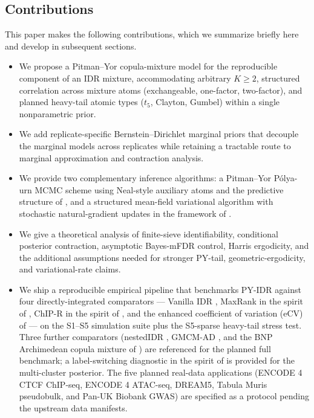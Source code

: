 \subsection{Contributions}

This paper makes the following contributions, which we summarize briefly here and develop in subsequent sections.
\begin{itemize}[leftmargin=*]
\item We propose a Pitman--Yor copula-mixture model for the reproducible component of an IDR mixture, accommodating arbitrary $K \geq 2$, structured correlation across mixture atoms (exchangeable, one-factor, two-factor), and planned heavy-tail atomic types ($t_5$, Clayton, Gumbel) within a single nonparametric prior.
\item We add replicate-specific Bernstein--Dirichlet marginal priors that decouple the marginal models across replicates while retaining a tractable route to marginal approximation and contraction analysis.
\item We provide two complementary inference algorithms: a Pitman--Yor P\'olya-urn MCMC scheme using Neal-style auxiliary atoms \citep{Neal2000} and the predictive structure of \citet{Pitman1996BlackwellMacQueen,IshwaranJames2001}, and a structured mean-field variational algorithm with stochastic natural-gradient updates in the framework of \citet{HoffmanBleiWangPaisley2013}.
\item We give a theoretical analysis of finite-sieve identifiability, conditional posterior contraction, asymptotic Bayes-mFDR control, Harris ergodicity, and the additional assumptions needed for stronger PY-tail, geometric-ergodicity, and variational-rate claims.
\item We ship a reproducible empirical pipeline that benchmarks PY-IDR against four directly-integrated comparators --- Vanilla IDR \citep{LiBrownHuangBickel2011}, MaxRank in the spirit of \citet{Philtron2018MaRR}, ChIP-R in the spirit of \citet{Newell2021ChIPR}, and the enhanced coefficient of variation (eCV) of \citet{Iakovidis2024eCV} --- on the S1--S5 simulation suite plus the S5-sparse heavy-tail stress test. Three further comparators (nestedIDR \citep{Ranalli2026nestedIDR}, GMCM-AD \citep{KasaRajan2020GMCM}, and the BNP Archimedean copula mixture of \citet{PanNietoBarajasCraiu2024}) are referenced for the planned full benchmark; a label-switching diagnostic in the spirit of \citet{Stephens2000Relabel} is provided for the multi-cluster posterior. The five planned real-data applications (ENCODE 4 CTCF ChIP-seq, ENCODE 4 ATAC-seq, DREAM5, Tabula Muris pseudobulk, and Pan-UK Biobank GWAS) are specified as a protocol pending the upstream data manifests.
\end{itemize}

